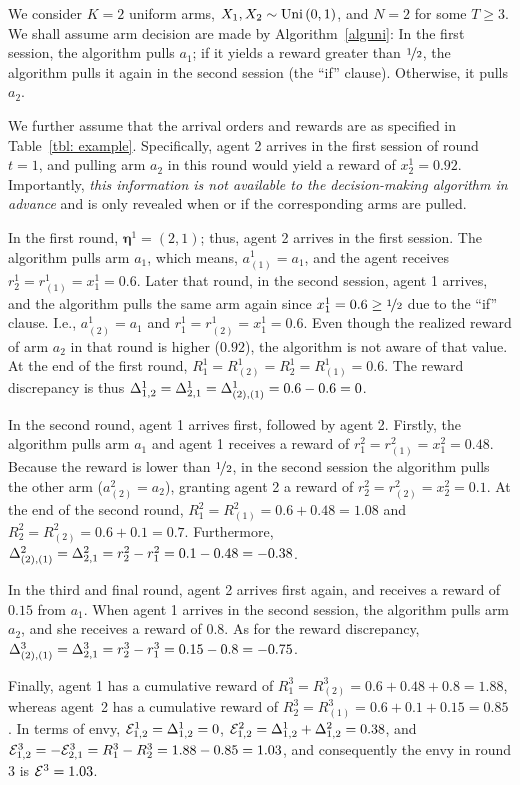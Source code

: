 \begin{example}\label{example 1}
We consider $K=2$ uniform arms, $X_1,X_2 \sim \text{Uni}\left(0,1\right)$, and $N=2$ for some $T\geq 3$. We shall assume arm decision are made by Algorithm~\ref{alguni}: In the first session, the algorithm pulls $a_1$; if it yields a reward greater than $\nicefrac{1}{2}$, the algorithm pulls it again in the second session (the ``if'' clause). Otherwise, it pulls $a_2$.



We further assume that the arrival orders and rewards are as specified in Table~\ref{tbl: example}. Specifically, agent 2 arrives in the first session of round $t=1$, and pulling arm $a_2$ in this round would yield a reward of $x^1_2 = 0.92$. Importantly, \emph{this information is not available to the decision-making algorithm in advance} and is only revealed when or if the corresponding arms are pulled.




In the first round, $\boldsymbol{\eta}^1 = \left(2,1\right)$; thus, agent 2 arrives in the first session.
The algorithm pulls arm $a_1$, which means, $a^1_{(1)} = a_1$, and the agent receives $r_{2}^1=r_{(1)}^1=x_1^1=0.6$.
Later that round, in the second session, agent 1 arrives, and the algorithm pulls the same arm again since $x^1_1 = 0.6 \geq \nicefrac{1}{2}$ due to the ``if'' clause.
I.e., $a^1_{(2)} = a_1$ and $r_{1}^1 = r_{(2)}^1 = x_1^1 = 0.6$.
Even though the realized reward of arm $a_2$ in that round is higher ($0.92$), the algorithm is not aware of that value.
At the end of the first round, $R^1_1 = R^1_{(2)} = R^1_2 = R^1_{(1)} = 0.6$. The reward discrepancy is thus $\Delta_{1,2}^1 = \Delta_{2,1}^1= \Delta_{\left(2\right),\left(1\right)}^1 = 0.6 - 0.6 =0$. 



In the second round, agent 1 arrives first, followed by agent 2.
Firstly, the algorithm pulls arm $a_1$ and agent 1 receives a reward of $r_{1}^2 = r_{(1)}^2 = x_1^2 = 0.48$.
Because the reward is lower than $\nicefrac{1}{2}$, in the second session the algorithm pulls the other arm ($a^2_{(2)} = a_2$), granting agent 2 a reward of $r_{2}^2 = r_{(2)}^2 = x_2^2 = 0.1$.
At the end of the second round, $R^2_1 = R^2_{(1)} = 0.6 + 0.48 = 1.08$ and $R^2_2 = R^2_{(2)} = 0.6 + 0.1 = 0.7$. Furthermore, $\Delta_{\left(2\right),\left(1\right)}^2 = \Delta_{2,1}^2 = r^2_{2} - r^2_{1} = 0.1 - 0.48 = -0.38$.

In the third and final round, agent 2 arrives first again, and receives a reward  of $0.15$ from $a_1$. When agent 1 arrives in the second session, the algorithm pulls arm $a_2$, and she receives a reward of $0.8$. As for the reward discrepancy, $\Delta_{\left(2\right),\left(1\right)}^3 = \Delta_{2,1}^3 = r^3_{2} - r^3_{1} = 0.15 - 0.8 = -0.75$. 

Finally, agent 1 has a cumulative reward of $R^3_1 = R^3_{(2)} = 0.6 + 0.48 + 0.8 = 1.88$, whereas agent~2 has a cumulative reward of $R^3_2 = R^3_{(1)} = 0.6 + 0.1 + 0.15 = 0.85$. In terms of envy, $\mathcal{E}^1_{1,2}= \Delta_{1,2}^1 =0$, $\mathcal{E}^2_{1,2}=\Delta_{1,2}^1+\Delta_{1,2}^2= 0.38$, and $\mathcal{E}^3_{1,2} = -\mathcal{E}^3_{2,1} = R^3_1-R^3_2 = 1.88-0.85 = 1.03$, and consequently the envy in round 3 is $\mathcal{E}^3 = 1.03$.
\end{example}


